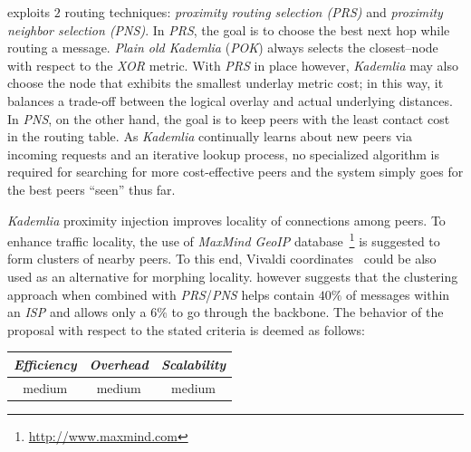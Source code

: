 \cite{KLKP2008} exploits $2$ routing techniques: 
\emph{proximity routing selection (PRS)} and 
\emph{proximity neighbor selection (PNS)}.
In \emph{PRS}, the goal is to choose the best next hop while routing a message.
\emph{Plain old Kademlia} (\emph{POK}) always selects the closest--node 
with respect to the \emph{XOR} metric.
With \emph{PRS} in place however, \emph{Kademlia} may also choose 
the node that exhibits the smallest underlay metric cost; in this way, 
it balances a trade-off between the logical overlay and 
actual underlying distances.
In \emph{PNS}, on the other hand, the goal is to keep peers 
with the least contact cost in the routing table. 
As \emph{Kademlia} continually learns about new
peers via incoming requests and an iterative lookup process, 
no specialized algorithm is required for searching for 
more cost-effective peers 
and the system simply goes for the best peers ``seen'' thus far.

\emph{Kademlia} proximity injection improves 
locality of connections among peers.
To enhance traffic locality, the use of 
{\sl MaxMind GeoIP} database~\footnote{\url{http://www.maxmind.com}} 
is suggested to form clusters of nearby peers.
To this end, Vivaldi coordinates~\cite{cox_vivaldi_2004} could be 
also used as an alternative for morphing locality. 
\cite{KLKP2008} however suggests that the clustering approach 
when combined with \emph{PRS}/\emph{PNS} helps contain 
$40\%$ of messages within an \emph{ISP} and allows only a $6\%$ 
to go through the backbone.
The behavior of the proposal with respect to the stated criteria is deemed as follows:
\begin{center}
{\footnotesize
\begin{tabular}{ccc}
\emph{Efficiency} & \emph{Overhead} & \emph{Scalability} \\
\hline
medium &
% 
medium &
medium
\end{tabular}
}
\end{center}

